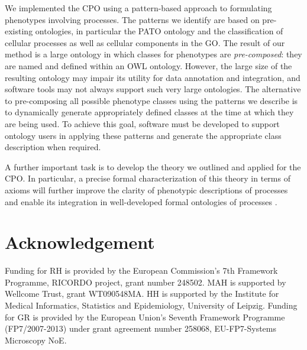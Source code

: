 \documentclass{bioinfo}
\renewcommand{\cite}{\citep}
\begin{document}
We implemented the CPO using a pattern-based approach to formulating
phenotypes involving processes. The patterns we identify are based on
pre-existing ontologies, in particular the PATO ontology and the
classification of cellular processes as well as cellular components in
the GO. The result of our method is a large ontology in which classes
for phenotypes are {\em pre-composed}: they are named and defined
within an OWL ontology. However, the large size of the resulting
ontology may impair its utility for data annotation and integration,
and software tools may not always support such very large
ontologies. The alternative to pre-composing all possible phenotype
classes using the patterns we describe is to dynamically generate
appropriately defined classes at the time at which they are being
used. To achieve this goal, software must be developed to support
ontology users in applying these patterns and generate the appropriate
class description when required.

A further important task is to develop the theory we outlined and
applied for the CPO. In particular, a precise formal characterization
of this theory in terms of axioms will further improve the clarity of
phenotypic descriptions of processes and enable its integration in
well-developed formal ontologies of processes \cite{Herre2006,
  Gruninger2010}.

\section{Acknowledgement}
Funding for RH is provided by the European Commission's 7th Framework
Programme, RICORDO project, grant number 248502. MAH is supported by
Wellcome Trust, grant WT090548MA. HH is supported by the Institute for
Medical Informatics, Statistics and Epidemiology, University of
Leipzig.  Funding for GR is provided by the European Union's Seventh
Framework Programme (FP7/2007-2013) under grant agreement number
258068, EU-FP7-Systems Microscopy NoE. 
\end{document}
